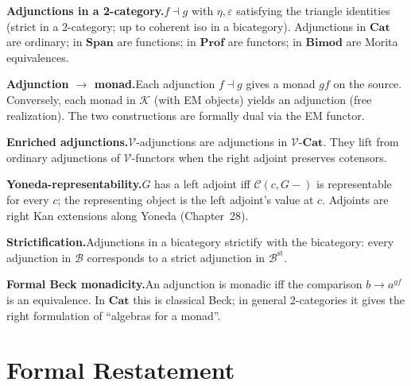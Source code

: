 \begin{summarybox}
\textbf{Adjunctions in a 2-category.}\quad $f \dashv g$ with $\eta, \varepsilon$
satisfying the triangle identities (strict in a 2-category; up to coherent iso
in a bicategory). Adjunctions in $\mathbf{Cat}$ are ordinary; in $\mathbf{Span}$
are functions; in $\mathbf{Prof}$ are functors; in $\mathbf{Bimod}$ are Morita
equivalences.

\textbf{Adjunction $\to$ monad.}\quad Each adjunction $f \dashv g$ gives a
monad $gf$ on the source. Conversely, each monad in $\mathcal{K}$ (with EM
objects) yields an adjunction (free realization). The two constructions are
formally dual via the EM functor.

\textbf{Enriched adjunctions.}\quad $\mathcal{V}$-adjunctions are adjunctions
in $\mathcal{V}$-$\mathbf{Cat}$. They lift from ordinary adjunctions of
$\mathcal{V}$-functors when the right adjoint preserves cotensors.

\textbf{Yoneda-representability.}\quad $G$ has a left adjoint iff
$\mathcal{C}(c, G-)$ is representable for every $c$; the representing object
is the left adjoint's value at $c$. Adjoints are right Kan extensions along
Yoneda (Chapter~28).

\textbf{Strictification.}\quad Adjunctions in a bicategory strictify with the
bicategory: every adjunction in $\mathcal{B}$ corresponds to a strict
adjunction in $\mathcal{B}^{\mathrm{st}}$.

\textbf{Formal Beck monadicity.}\quad An adjunction is monadic iff the
comparison $b \to a^{gf}$ is an equivalence. In $\mathbf{Cat}$ this is
classical Beck; in general 2-categories it gives the right formulation of
``algebras for a monad''.
\end{summarybox}


\section*{Formal Restatement}

